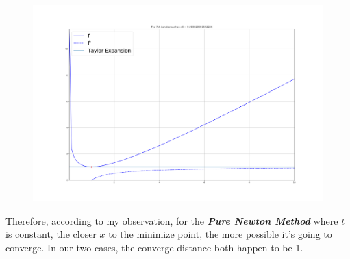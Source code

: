 \documentclass{article}
\theoremstyle{definition}
\theoremstyle{definition}
\theoremstyle{remark}
\begin{document}
\begin{enumerate}
\begin{figure}[H]
    \end{figure}
    \begin{figure}[H]
        \centering
        \includegraphics[scale=0.25]{f47.png}
    \end{figure}
    Therefore, according to my observation, for the \textbf{\emph{Pure Newton Method}} where $t$ is constant, the closer $x$ to the minimize point, the more possible it's going to converge. In our two cases, the converge distance both happen to be 1. 
\end{enumerate}

\end{document}
